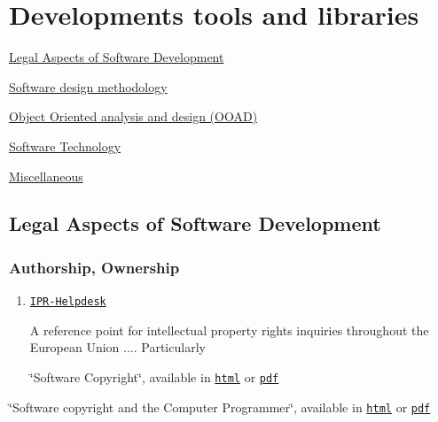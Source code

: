 \hypertarget{developments}{}\section{Developments tools and libraries}\label{developments}
\hyperlink{developments_legal}{Legal Aspects of Software Development} \par
 \hyperlink{developments_softwareDesign}{Software design methodology} \par
 \hyperlink{developments_objectOriented}{Object Oriented analysis and design (OOAD)} \par
 \hyperlink{developments_softwareTechnology}{Software Technology} \par
 \hyperlink{developments_miscLinks}{Miscellaneous}\hypertarget{developments_legal}{}\subsection{Legal Aspects of Software Development}\label{developments_legal}
\hypertarget{developments_sub1}{}\subsubsection{Authorship, Ownership}\label{developments_sub1}
\begin{enumerate}
\item \href{http://www.ipr-helpdesk.org/}{\tt IPR-Helpdesk}\par
 A reference point for intellectual property rights inquiries throughout the European Union .... Particularly \par
 \char`\"{}Software Copyright\char`\"{}, available in \href{http://www.ipr-helpdesk.org/docs/docs.EN/softwareCopyright.html}{\tt html} or \href{http://www.ipr-helpdesk.org/docs/docs.EN/softwareCopyright.pdf}{\tt pdf}\end{enumerate}


\char`\"{}Software copyright and the Computer Programmer\char`\"{}, available in \href{http://www.ipr-helpdesk.org/docs/docs.EN/softwareCopyrightAndTheComputerProgrammer.html}{\tt html} or \href{http://www.ipr-helpdesk.org/docs/docs.EN/softwareCopyrightAndTheComputerProgrammer.pdf}{\tt pdf}

